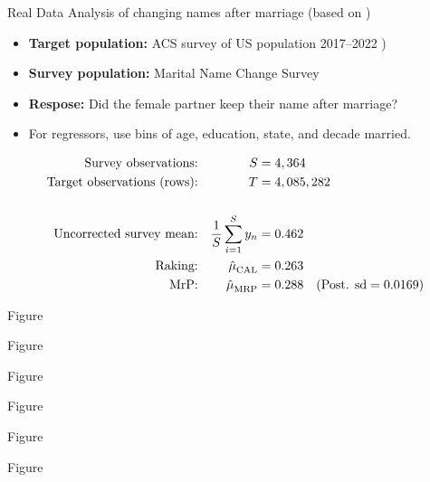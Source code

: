 
\begin{frame}{Real Data}
Analysis of changing names after marriage (based on \textcite{alexander:2019:namechange})

\begin{itemize}
    \item \textbf{Target population:} ACS survey of US population 2017--2022 \parencite{ipumsusa})
    \item \textbf{Survey population:} Marital Name Change Survey \parencite{cohen:2019:namechange}
    \item \textbf{Respose:}  Did the female partner keep their name after marriage?
    \item For regressors, use bins of age, education, state, and decade married.
\end{itemize}

$$
\begin{aligned}
    \textrm{Survey observations:} &&  S ={}& 4,364  \\
    \textrm{Target observations (rows):} &&  T ={}& 4,085,282 \\
    \\
    \textrm{Uncorrected survey mean:} && \frac{1}{S} \sum_{i=1}^S y_n ={}& 0.462 \\
    \textrm{Raking:} && \hat{\mu}^{}_{\mathrm{CAL}} ={}& 0.263 \\
    \textrm{MrP:} && \hat{\mu}^{}_{\mathrm{MRP}} ={}& 0.288
        \quad(\textrm{Post. sd} = 0.0169)\\
\end{aligned}
$$
%
\end{frame}


\begin{frame}{Figure}
\AlexanderImbalancePrimary{}
\end{frame}


\begin{frame}{Figure}
\AlexanderImbalanceInteraction{}
\end{frame}


\begin{frame}{Figure}
    \AlexanderPredictionFig{}
\end{frame}



\begin{frame}{Figure}
    \AlexanderPredictionFigTwo{}
\end{frame}




\begin{frame}{Figure}
    \AlexanderPredictionFigThree{}
\end{frame}



\begin{frame}{Figure}
    \AlexanderPredictionFigFour{}
\end{frame}


